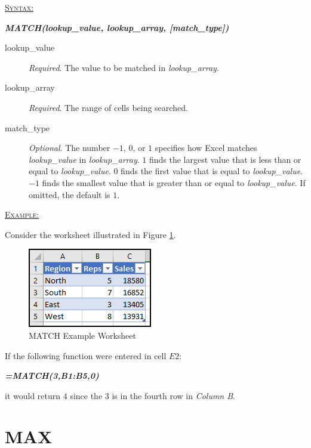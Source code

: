\begin{addmargin}[1cm]{0cm}
	
	\medskip
	\underline{\textsc{Syntax:}}
	\medskip
	
	{\color{Syntax}
		\noindent\textbf{\textit{MATCH(lookup\_value, lookup\_array, [match\_type])}}
	}
	
	\begin{description}
		\item[lookup\_value] \textit{Required}. The value to be matched in \textit{lookup\_array}.
		\item[lookup\_array] \textit{Required}. The range of cells being searched.
		\item[match\_type] \textit{Optional}. The number $ -1 $, $ 0 $, or $ 1 $ specifies how Excel matches \textit{lookup\_value} in \textit{lookup\_array}. $ 1 $ finds the largest value that is less than or equal to \textit{lookup\_value}. $ 0 $ finds the first value that is equal to \textit{lookup\_value}. $ -1 $ finds the smallest value that is greater than or equal to \textit{lookup\_value}. If omitted, the default is $ 1 $.
	\end{description}

	\medskip
	\noindent\underline{\textsc{Example:}}
	\medskip
	
	\noindent Consider the worksheet illustrated in Figure \ref{apa:mat}.
	
	\begin{figure}[H]
		\centering
		\includegraphics[width=\maxwidth{.45\linewidth}]{gfx/apa_fig01}
		\caption{MATCH Example Worksheet}
		\label{apa:mat}
	\end{figure}
	
	\noindent If the following function were entered in cell $ E2 $:
	
	{\color{Syntax}
		\textit{\textbf{=MATCH(3,B1:B5,0)}}
	}
	
	\noindent it would return $ 4 $ since the $ 3 $ is in the fourth row in \textit{Column B}.

\end{addmargin}

\section{MAX}

